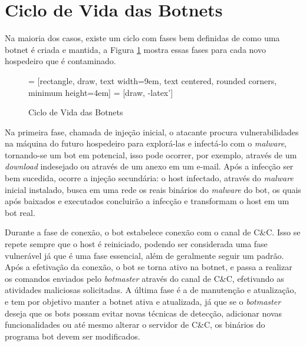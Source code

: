 \section{Ciclo de Vida das Botnets}
Na maioria dos casos, existe um ciclo com fases bem definidas de como uma botnet é criada e mantida, a Figura \ref{fig:botnets_lifecycle} mostra essas fases para cada novo hospedeiro que é contaminado.

\begin{figure}
 = [rectangle, draw, text width=9em, text centered, rounded corners, minimum height=4em]
 = [draw, -latex']
\centering
{}
\caption[Ciclo de Vida das Botnets]{Ciclo de Vida das Botnets} \label{fig:botnets_lifecycle}
\end{figure}

Na primeira fase, chamada de injeção inicial, o atacante procura vulnerabilidades na máquina do futuro hospedeiro para explorá-las e infectá-lo com o \textit{malware}, tornando-se um bot em potencial, isso pode ocorrer, por exemplo, através de um \textit{download} indesejado ou através de um anexo em um e-mail. Após a infecção ser bem sucedida, ocorre a injeção secundária: o host infectado, através do \textit{malware} inicial instalado, busca em uma rede os reais binários do \textit{malware} do bot, os quais após baixados e executados concluirão a infecção e transformam o host em um bot real.\citep{feily2009survey}

Durante a fase de conexão, o bot estabelece conexão com o canal de C\&C. Isso se repete sempre que o host é reiniciado, podendo ser considerada uma fase vulnerável já que é uma fase essencial, além de geralmente seguir um padrão. Após a efetivação da conexão, o bot se torna ativo na botnet, e passa a realizar os comandos enviados pelo \textit{botmaster} através do canal de C\&C, efetivando as atividades maliciosas solicitadas. A última fase é a de manutenção e atualização, e tem por objetivo manter a botnet ativa e atualizada, já que se o \textit{botmaster} deseja que os bots possam evitar novas técnicas de detecção, adicionar novas funcionalidades ou até mesmo alterar o servidor de C\&C, os binários do programa bot devem ser modificados.


